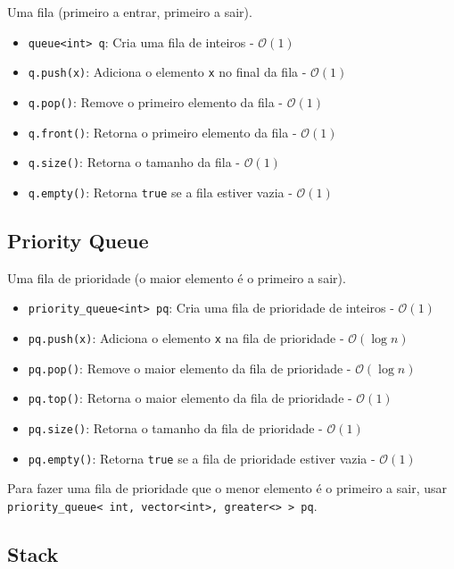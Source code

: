 \documentclass[10pt, a4paper, oneside]{book}
\begin{document}
Uma fila (primeiro a entrar, primeiro a sair).

\begin{itemize}
    \item \texttt{queue<int> q}: Cria uma fila de inteiros - $\mathcal{O}(1)$
    \item \texttt{q.push(x)}: Adiciona o elemento \texttt{x} no final da fila - $\mathcal{O}(1)$
    \item \texttt{q.pop()}: Remove o primeiro elemento da fila - $\mathcal{O}(1)$
    \item \texttt{q.front()}: Retorna o primeiro elemento da fila - $\mathcal{O}(1)$
    \item \texttt{q.size()}: Retorna o tamanho da fila - $\mathcal{O}(1)$
    \item \texttt{q.empty()}: Retorna \texttt{true} se a fila estiver vazia - $\mathcal{O}(1)$
\end{itemize}

\subsection{Priority Queue}

Uma fila de prioridade (o maior elemento é o primeiro a sair).

\begin{itemize}
    \item \texttt{priority\_queue<int> pq}: Cria uma fila de prioridade de inteiros - $\mathcal{O}(1)$
    \item \texttt{pq.push(x)}: Adiciona o elemento \texttt{x} na fila de prioridade - $\mathcal{O}(\log n)$
    \item \texttt{pq.pop()}: Remove o maior elemento da fila de prioridade - $\mathcal{O}(\log n)$
    \item \texttt{pq.top()}: Retorna o maior elemento da fila de prioridade - $\mathcal{O}(1)$
    \item \texttt{pq.size()}: Retorna o tamanho da fila de prioridade - $\mathcal{O}(1)$
    \item \texttt{pq.empty()}: Retorna \texttt{true} se a fila de prioridade estiver vazia - $\mathcal{O}(1)$
\end{itemize}

Para fazer uma fila de prioridade que o menor elemento é o primeiro a sair, usar \texttt{priority\_queue< int, vector<int>, greater<> > pq}.

\subsection{Stack}
\end{document}
